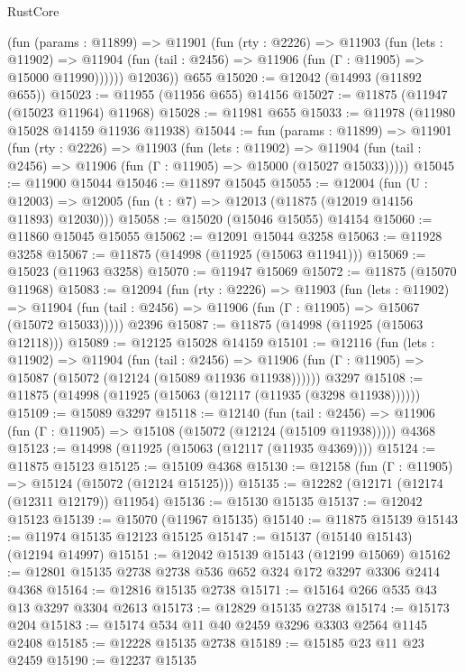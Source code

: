\begin{lexlean}{RustCore}
\begin{coremodule}
          (fun (params : @11899) =>
          @11901
            (fun (rty : @2226) =>
            @11903
              (fun (lets : @11902) =>
              @11904 (fun (tail : @2456) => @11906 (fun (Γ : @11905) => @15000 @11990))))))
        @12036))
    @655
@15020 := @12042 (@14993 (@11892 @655))
@15023 := @11955 (@11956 @655) @14156
@15027 := @11875 (@11947 (@15023 @11964) @11968)
@15028 := @11981 @655
@15033 := @11978 (@11980 @15028 @14159 @11936 @11938)
@15044 := fun (params : @11899) =>
  @11901
    (fun (rty : @2226) =>
    @11903
      (fun (lets : @11902) =>
      @11904 (fun (tail : @2456) => @11906 (fun (Γ : @11905) => @15000 (@15027 @15033)))))
@15045 := @11900 @15044
@15046 := @11897 @15045
@15055 := @12004
    (fun (U : @12003) => @12005 (fun (t : @7) => @12013 (@11875 (@12019 @14156 @11893) @12030)))
@15058 := @15020 (@15046 @15055) @14154
@15060 := @11860 @15045 @15055
@15062 := @12091 @15044 @3258
@15063 := @11928 @3258
@15067 := @11875 (@14998 (@11925 (@15063 @11941)))
@15069 := @15023 (@11963 @3258)
@15070 := @11947 @15069
@15072 := @11875 (@15070 @11968)
@15083 := @12094
    (fun (rty : @2226) =>
    @11903
      (fun (lets : @11902) =>
      @11904 (fun (tail : @2456) => @11906 (fun (Γ : @11905) => @15067 (@15072 @15033)))))
    @2396
@15087 := @11875 (@14998 (@11925 (@15063 @12118)))
@15089 := @12125 @15028 @14159
@15101 := @12116
    (fun (lets : @11902) =>
    @11904
      (fun (tail : @2456) =>
      @11906 (fun (Γ : @11905) => @15087 (@15072 (@12124 (@15089 @11936 @11938))))))
    @3297
@15108 := @11875 (@14998 (@11925 (@15063 (@12117 (@11935 (@3298 @11938))))))
@15109 := @15089 @3297
@15118 := @12140
    (fun (tail : @2456) => @11906 (fun (Γ : @11905) => @15108 (@15072 (@12124 (@15109 @11938)))))
    @4368
@15123 := @14998 (@11925 (@15063 (@12117 (@11935 @4369))))
@15124 := @11875 @15123
@15125 := @15109 @4368
@15130 := @12158 (fun (Γ : @11905) => @15124 (@15072 (@12124 @15125)))
@15135 := @12282 (@12171 (@12174 (@12311 @12179)) @11954)
@15136 := @15130 @15135
@15137 := @12042 @15123
@15139 := @15070 (@11967 @15135)
@15140 := @11875 @15139
@15143 := @11974 @15135 @12123 @15125
@15147 := @15137 (@15140 @15143) (@12194 @14997)
@15151 := @12042 @15139 @15143 (@12199 @15069)
@15162 := @12801 @15135 @2738 @2738 @536 @652 @324 @172 @3297 @3306 @2414 @4368
@15164 := @12816 @15135 @2738
@15171 := @15164 @266 @535 @43 @13 @3297 @3304 @2613
@15173 := @12829 @15135 @2738
@15174 := @15173 @204
@15183 := @15174 @534 @11 @40 @2459 @3296 @3303 @2564 @1145 @2408
@15185 := @12228 @15135 @2738
@15189 := @15185 @23 @11 @23 @2459
@15190 := @12237 @15135

\end{coremodule}
\end{lexlean}
